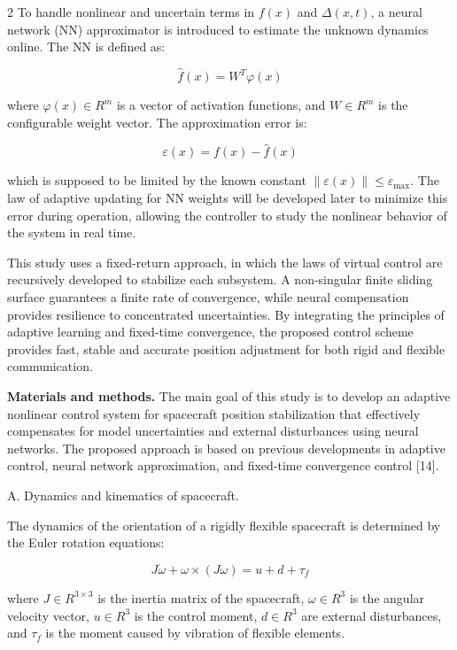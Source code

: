 \begin{multicols}{2}
To handle nonlinear and uncertain terms in \(f(x)\) and
\(\Delta (x,t)\), a neural network (NN) approximator is
introduced to estimate the unknown dynamics online. The NN is defined
as:

\begin{equation}
\widehat{f}(x) = W^{Τ}\varphi(x)
\end{equation}

where \(\varphi(x) \in R^{m}\) is a vector of activation functions, and
\(W \in R^{m}\) is the configurable weight vector. The approximation
error is:

\begin{equation}
\varepsilon(x) = f(x) - \widehat{f}(x)
\end{equation}

which is supposed to be limited by the known constant
\(\left\| \varepsilon(x) \right\| \leq \varepsilon_{\max}\). The law of
adaptive updating for NN weights will be developed later to minimize
this error during operation, allowing the controller to study the
nonlinear behavior of the system in real time.

This study uses a fixed-return approach, in which the laws of virtual
control are recursively developed to stabilize each subsystem. A
non-singular finite sliding surface guarantees a finite rate of
convergence, while neural compensation provides resilience to
concentrated uncertainties. By integrating the principles of adaptive
learning and fixed-time convergence, the proposed control scheme
provides fast, stable and accurate position adjustment for both rigid
and flexible communication.

{\bfseries Materials and methods.} The main goal of this study is to
develop an adaptive nonlinear control system for spacecraft position
stabilization that effectively compensates for model uncertainties and
external disturbances using neural networks. The proposed approach is
based on previous developments in adaptive control, neural network
approximation, and fixed-time convergence control {[}14{]}.

A. Dynamics and kinematics of spacecraft.

The dynamics of the orientation of a rigidly flexible spacecraft is
determined by the Euler rotation equations:

\begin{equation}
J\dot{\omega} + \omega \times (J\omega) = u + d + \tau_{f}
\end{equation}

where \(J \in R^{3 \times 3}\) is the inertia matrix of the spacecraft,
\(\omega \in R^{3}\) is the angular velocity vector, \(u \in R^{3}\) is
the control moment, \(d \in R^{3}\) are external disturbances, and
\(\tau_{f}\) is the moment caused by vibration of flexible elements.


\end{multicols}
